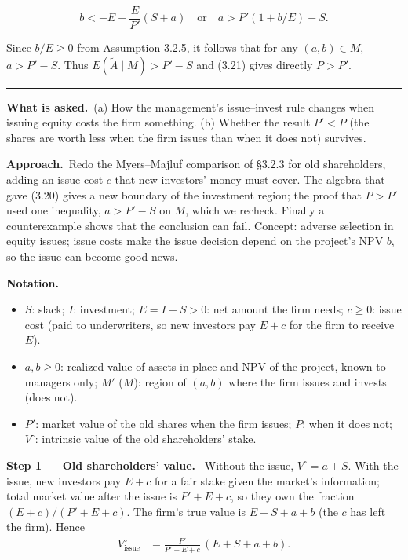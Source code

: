 \documentclass[11pt,a4paper]{article}
\newcommand{\notation}{\par\noindent\textbf{Notation.}}
\newcommand{\step}[2]{\par\medskip\noindent\textbf{Step #1 --- #2.}~}
\newcommand{\asked}{\par\medskip\noindent\textbf{What is asked.}~}
\newcommand{\approach}{\par\smallskip\noindent\textbf{Approach.}~}
\newcommand{\stmtend}{\par\endgroup\nopagebreak\noindent\rule{\linewidth}{0.4pt}\par\medskip}
\begin{document}
\[b < -E + \frac{E}{P'}(S + a) \quad \text{or} \quad a > P'(1 + b/E) - S.\]

Since \(b/E \geq 0\) from Assumption 3.2.5, it follows that for any \((a, b) \in M\),
\(a > P' - S\). Thus \(E(\widetilde{A} \mid M) > P' - S\) and (3.21) gives directly \(P > P'\).
\stmtend

\asked (a) How the management's issue--invest rule changes when issuing equity costs the firm something. (b) Whether the result $P'<P$ (the shares are worth less when the firm issues than when it does not) survives.

\approach Redo the Myers--Majluf comparison of \S3.2.3 for old shareholders, adding an issue cost $c$ that new investors' money must cover. The algebra that gave (3.20) gives a new boundary of the investment region; the proof that $P>P'$ used one inequality, $a>P'-S$ on $M$, which we recheck. Finally a counterexample shows that the conclusion can fail. Concept: adverse selection in equity issues; issue costs make the issue decision depend on the project's NPV $b$, so the issue can become good news.

\notation
\begin{itemize}
  \item $S$: slack; $I$: investment; $E=I-S>0$: net amount the firm needs; $c\ge 0$: issue cost (paid to underwriters, so new investors pay $E+c$ for the firm to receive $E$).
  \item $a,b\ge0$: realized value of assets in place and NPV of the project, known to managers only; $M'$ ($M$): region of $(a,b)$ where the firm issues and invests (does not).
  \item $P'$: market value of the old shares when the firm issues; $P$: when it does not; $V^\circ$: intrinsic value of the old shareholders' stake.
\end{itemize}

\step{1}{Old shareholders' value} Without the issue, $V^\circ=a+S$. With the issue, new investors pay $E+c$ for a fair stake given the market's information; total market value after the issue is $P'+E+c$, so they own the fraction $(E+c)/(P'+E+c)$. The firm's true value is $E+S+a+b$ (the $c$ has left the firm). Hence
\begin{align}
  V^\circ_{\text{issue}} &= \frac{P'}{P'+E+c}\,(E+S+a+b). \label{r5e12-V}
\end{align}
\end{document}

